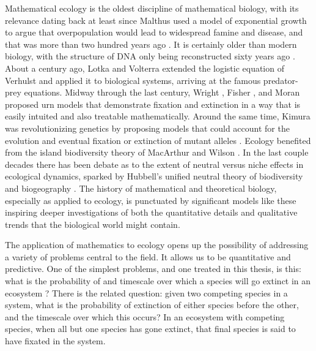 Mathematical ecology is the oldest discipline of mathematical biology, with its relevance dating back at least since Malthus used a model of exponential growth to argue that overpopulation would lead to widespread famine and disease, and that was more than two hundred years ago \cite{Malthus1798}. 
It is certainly older than modern biology, with the structure of DNA only being reconstructed sixty years ago \cite{Watson1953,Klug1968}. 
About a century ago, Lotka \cite{Lotka1920} and Volterra \cite{Volterra1926} extended the logistic equation of Verhulst \cite{Verhulst1838} and applied it to biological systems, arriving at the famous predator-prey equations. 
Midway through the last century, Wright \cite{Wright1931}, Fisher \cite{Fisher1930}, and Moran \cite{Moran1962} proposed urn models that demonstrate fixation and extinction in a way that is easily intuited and also treatable mathematically. 
Around the same time, Kimura was revolutionizing genetics by proposing models that could account for the evolution and eventual fixation or extinction of mutant alleles \cite{Crow1956,Kimura1964}. 
Ecology benefited from the island biodiversity theory of MacArthur and Wilson \cite{MacArthur1963,MacArthur1967}. 
In the last couple decades there has been debate as to the extent of neutral versus niche effects in ecological dynamics, sparked by Hubbell's unified neutral theory of biodiversity and biogeography \cite{Hubbell2001}. 
The history of mathematical and theoretical biology, especially as applied to ecology, is punctuated by significant models like these inspiring deeper investigations of both the quantitative details and qualitative trends that the biological world might contain. 

The application of mathematics to ecology opens up the possibility of addressing a variety of problems central to the field. 
It allows us to be quantitative and predictive. 
One of the simplest problems, and one treated in this thesis, is this: what is the probability of and timescale over which a species will go extinct in an ecosystem \cite{Badali2019a,Badali2019b}? 
There is the related question: given two competing species in a system, what is the probability of extinction of either species before the other, and the timescale over which this occurs? 
In an ecosystem with competing species, when all but one species has gone extinct, that final species is said to have fixated in the system. 

